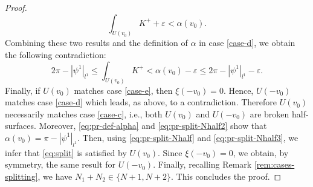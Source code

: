 \documentclass{article}
\newcommand{\halfP}{B}
\theoremstyle{remark}
\newtheorem{remarkE}[theorem]{Remark}
\theoremstyle{prpart}
\newcommand{\comment}[1]{}
\begin{document}
\begin{proof}
\begin{equation}
\int_{U(v_0)}{K^+}+\varepsilon < \alpha(v_0).
\end{equation}
Combining these two results and the definition of $\alpha$ in case \ref{case-d}, we obtain the following contradiction:
\begin{equation*}
  2\pi-|\psi^1|_{l^1}\leq \int_{U(v_0)}{K^+} < \alpha(v_0)-\varepsilon \leq 2\pi-|\psi^1|_{l^1}-\varepsilon.
\end{equation*}
Finally, if $U(v_0)$ matches case \ref{case-e}, then $\xi(-v_0)=0$. Hence, $U(-v_0)$ matches case \ref{case-d} which leads, as above, to a contradiction.
Therefore $U(v_0)$ necessarily matches case \ref{case-c}, i.e., both $U(v_0)$ and $U(-v_0)$ are broken half-surfaces. Moreover, \eqref{eq:pr-def-alpha} and \eqref{eq:pr-split-Nhalf2} show that $\alpha(v_0) = \pi-|\psi^1|_{l^1}$. Then, using \eqref{eq:pr-split-Nhalf} and \eqref{eq:pr-split-Nhalf3}, we infer that \eqref{eq:split} is satisfied by $U(v_0)$. Since $\xi(-v_0)=0$, we obtain, by symmetry, the same result for $U(-v_0)$. Finally, recalling Remark \ref{rem:cases-splitting}, we have $N_1+N_2\in\{N+1,N+2\}$. This concludes the proof.
\end{proof}

\comment{
\begin{remarkE}
Note that, as in \eqref{eq:res-burago}, in order to minimize the number of $N$-half-surfaces in the final step of the proof, it would be necessary to take into account the angle between $\sigma$ and the boundary of $\halfP_c$ in \eqref{eq:split}.
\end{remarkE}
}
\end{document}
